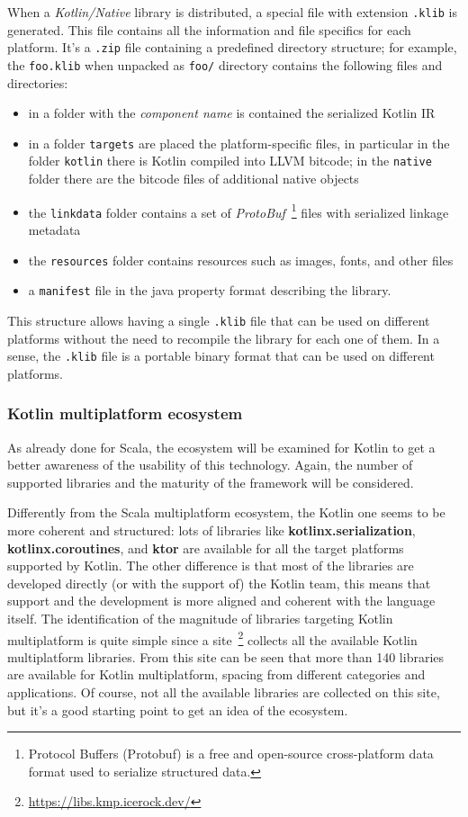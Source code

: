 When a \emph{Kotlin/Native} library is distributed, a special file with extension \texttt{.klib} is generated. This file contains all the information and file specifics for each platform. It's a \texttt{.zip} file containing a predefined directory structure; for example,
the \texttt{foo.klib} when unpacked as \texttt{foo/} directory contains the following files and directories:
\begin{itemize}
	\item in a folder with the \emph{component name} is contained the serialized Kotlin IR
	\item in a folder \texttt{targets} are placed the platform-specific files, in particular in the folder \texttt{kotlin} there is Kotlin compiled
	      into LLVM bitcode; in the \texttt{native} folder there are the bitcode files of additional native objects
	\item the \texttt{linkdata} folder contains a set of \emph{ProtoBuf}~\footnote{Protocol Buffers (Protobuf) is a free and open-source
		      cross-platform data format used to serialize structured data.} files with serialized linkage metadata
	\item the \texttt{resources} folder contains resources such as images, fonts, and other files
	\item a \texttt{manifest} file in the java property format describing the library.
\end{itemize}

This structure allows having a single \texttt{.klib} file that can be used on different platforms without the need to recompile the library for each
one of them. In a sense, the \texttt{.klib} file is a portable binary format that can be used on different platforms.

\subsubsection{Kotlin multiplatform ecosystem}

As already done for Scala, the ecosystem will be examined for Kotlin to get a better awareness of the usability of this technology.
Again, the number of supported libraries and the maturity of the framework will be considered.

Differently from the Scala multiplatform ecosystem, the Kotlin one seems to be more coherent and structured: lots of libraries
like \textbf{kotlinx.serialization}, \textbf{kotlinx.coroutines}, and \textbf{ktor} are available for all the target platforms supported by Kotlin.
The other difference is that most of the libraries are developed directly (or with the support of) the Kotlin team, this means that support and the
development is more aligned and coherent with the language itself.
The identification of the magnitude of libraries targeting Kotlin multiplatform is quite simple since a
site~\footnote{\url{https://libs.kmp.icerock.dev/}} collects all the available Kotlin multiplatform libraries. From this site can be seen that more
than 140 libraries are available for Kotlin multiplatform, spacing from different categories and applications. Of course, not all the available
libraries are collected on this site, but it's a good starting point to get an idea of the ecosystem.

